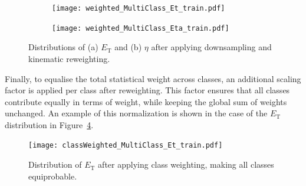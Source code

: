 \begin{figure}[htbp]
  \centering
  \begin{subfigure}[b]{0.49\textwidth}
      \centering
      \texttt{[image: weighted\_MultiClass\_Et\_train.pdf]}
      \caption{}
      \label{fig:et_reweighted}
  \end{subfigure}
  \hfill
  \begin{subfigure}[b]{0.49\textwidth}
      \centering
      \texttt{[image: weighted\_MultiClass\_Eta\_train.pdf]}
      \caption{}
      \label{fig:eta_reweighted}
  \end{subfigure}
  \caption{Distributions of (a) $E_{\text{T}}$ and (b) $\eta$ after applying downsampling and kinematic reweighting.}
  \label{fig:et_eta_reweighted}
\end{figure}

Finally, to equalise the total statistical weight across classes, an additional scaling factor is applied per class after reweighting. This factor ensures that all classes contribute equally in terms of weight, while keeping the global sum of weights unchanged. An example of this normalization is shown in the case of the $E_{\text{T}}$ distribution in Figure~\ref{fig:et_classWeighted}.

\begin{figure}[htbp]
  \centering
  \texttt{[image: classWeighted\_MultiClass\_Et\_train.pdf]}
  \caption{Distribution of $E_{\text{T}}$ after applying class weighting, making all classes equiprobable.}
  \label{fig:et_classWeighted}
\end{figure}


